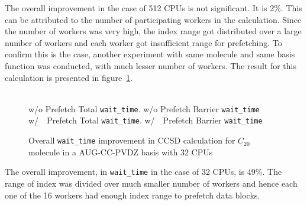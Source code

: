 The overall improvement in the case of 512 CPUs is not significant. It is 2\%. This
can be attributed to the number of participating workers in the calculation. Since
the number of workers was very high, the index range got distributed over a large
number of workers and each worker got insufficient range for prefetching. To confirm
this is the case, another experiment with same molecule and same basis function
was conducted, with much lesser number of workers. The result for this calculation
is presented in figure~\ref{fig:prefetch_real_32}.

\begin{figure}[h]
  
  \\
   w/o Prefetch Total \texttt{wait\_time}.
   w/o Prefetch Barrier \texttt{wait\_time}
  \\
   w/~~Prefetch Total \texttt{wait\_time}.
    w/~~Prefetch Barrier \texttt{wait\_time}
  \caption{Overall \texttt{wait\_time} improvement in CCSD calculation for $C_{20}$ molecule in a AUG-CC-PVDZ basis with 32 CPUs}
  \label{fig:prefetch_real_32}
\end{figure}

The overall improvement, in \texttt{wait\_time} in the case of 32 CPUs, is 49\%.
The range of index was divided over much smaller number of workers and hence
each one of the 16 workers had enough index range to prefetch data blocks.
